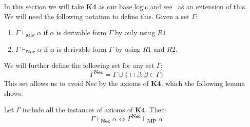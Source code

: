\documentclass[../main.tex]{subfiles}
\begin{document}
In this section we will take \textbf{K4} as our base logic and see \GL\  as an
extension of this.
We will need the following notation to
define this. Given a set $\Gamma$:
\begin{enumerate}
	\item $\Gamma\vdash_{\textbf{MP}}\alpha$ if $\alpha$ is derivable form $\Gamma$ by
		only using $R1$
	\item $\Gamma\vdash_{\textbf{Nec}}\alpha$ if $\alpha$ is derivable form $\Gamma$ by
		using $R1$ and $R2$.
\end{enumerate}
We will further define the following set for any set $\Gamma$:
\[
	\Gamma^{\textbf{Nec}}=\Gamma\cup\{\Box\beta:\beta\in\Gamma\}
\]
This set allows us to avoid Nec by the axioms of \textbf{K4}, which the
following lemma shows:
\begin{lem}
	Let $\Gamma$ include all the instances  of axioms of \textbf{K4}. Then:
	\[
		\Gamma\vdash_{\textbf{Nec}}\alpha\Leftrightarrow\Gamma^{\textbf{Nec}}\vdash_{\textbf{MP}}\alpha
	\]
\end{lem}
\end{document}
